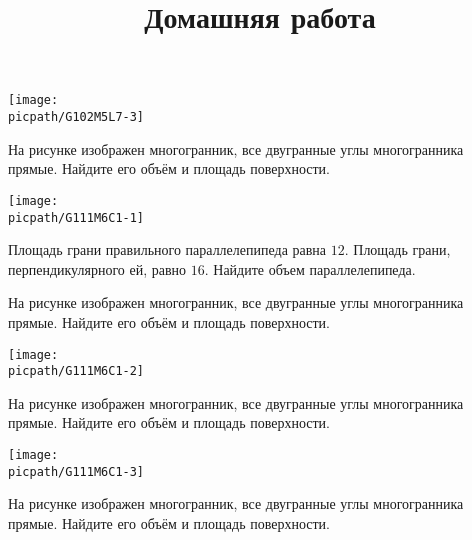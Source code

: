 \begin{consultation}
\begin{listofex}
\begin{minipage}[t]{\bodywidth}
		\end{minipage}
		\hspace{0.02\linewidth}
		\begin{minipage}[t]{\picwidth}
			\texttt{[image: \\picpath/G102M5L7-3]}
		\end{minipage}
		\item
		\begin{minipage}[t]{\bodywidth}
			На рисунке изображен многогранник, все двугранные углы многогранника прямые. Найдите его объём и площадь поверхности.
		\end{minipage}
		\hspace{0.02\linewidth}
		\begin{minipage}[t]{\picwidth}
			\texttt{[image: \\picpath/G111M6C1-1]}
		\end{minipage}
		\item Площадь грани правильного параллелепипеда равна \( 12 \). Площадь грани, перпендикулярного ей, равно \(16\). Найдите объем параллелепипеда.
	\end{listofex}
	\newpage
	\title{Домашняя работа}
	\begin{listofex}
		\item
		\begin{minipage}[t]{\bodywidth}
			На рисунке изображен многогранник, все двугранные углы многогранника прямые. Найдите его объём и площадь поверхности.
		\end{minipage}
		\hspace{0.02\linewidth}
		\begin{minipage}[t]{\picwidth}
			\texttt{[image: \\picpath/G111M6C1-2]}
		\end{minipage}
		\item
		\begin{minipage}[t]{\bodywidth}
			На рисунке изображен многогранник, все двугранные углы многогранника прямые. Найдите его объём и площадь поверхности.
		\end{minipage}
		\hspace{0.02\linewidth}
		\begin{minipage}[t]{\picwidth}
			\texttt{[image: \\picpath/G111M6C1-3]}
		\end{minipage}
		\item
		\begin{minipage}[t]{\bodywidth}
			На рисунке изображен многогранник, все двугранные углы многогранника прямые. Найдите его объём и площадь поверхности.
		\end{minipage}

\end{listofex}
\end{consultation}

